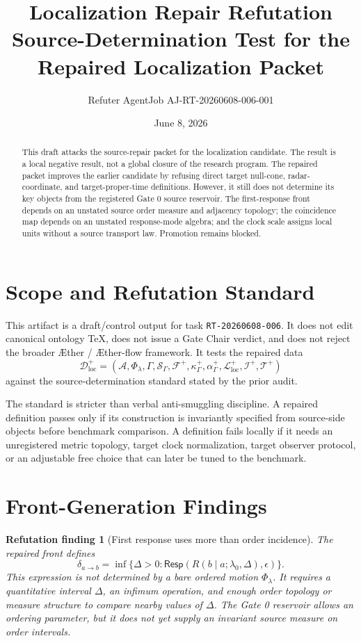 \documentclass[11pt]{article}
\title{\textbf{Localization Repair Refutation}\\[0.35em]
\large Source-Determination Test for the Repaired Localization Packet}
\author{Refuter AgentJob AJ-RT-20260608-006-001}
\date{June 8, 2026}
\newcommand{\Aether}{\AE{}ther}
\newcommand{\Aflow}{\AE{}ther-flow}
\newcommand{\TheoryProgram}{\Aether{} / \Aflow{} framework}
\newcommand{\Sub}{\mathcal{A}}
\newcommand{\PhiFlow}{\Phi_{\lambda}}
\newcommand{\Order}{\mathcal{S}}
\newcommand{\Front}{\mathcal{F}}
\newcommand{\Map}{\mathcal{L}_{\mathrm{loc}}}
\newcommand{\Data}{\mathcal{D}_{\mathrm{loc}}}
\newtheorem{refutationfinding}{Refutation finding}
\begin{document}
\maketitle

\begin{abstract}
This draft attacks the source-repair packet for the localization candidate. The
result is a local negative result, not a global closure of the research
program. The repaired packet improves the earlier candidate by refusing direct
target null-cone, radar-coordinate, and target-proper-time definitions.
However, it still does not determine its key objects from the registered Gate
0 source reservoir. The first-response front depends on an unstated source
order measure and adjacency topology; the coincidence map depends on an
unstated response-mode algebra; and the clock scale assigns local units without
a source transport law. Promotion remains blocked.
\end{abstract}

\section{Scope and Refutation Standard}

This artifact is a draft/control output for task \texttt{RT-20260608-006}. It
does not edit canonical ontology TeX, does not issue a Gate Chair verdict, and
does not reject the broader \TheoryProgram{}. It tests the repaired data
\[
\Data^{+}
=
(\Sub,\PhiFlow,\Gamma,\Order_{\Gamma},\Front^{+},
\kappa^{+}_{\Gamma},\alpha^{+}_{\Gamma},\Map^{+},\mathcal{I}^{+},
\mathcal{T}^{+})
\]
against the source-determination standard stated by the prior audit.

The standard is stricter than verbal anti-smuggling discipline. A repaired
definition passes only if its construction is invariantly specified from
source-side objects before benchmark comparison. A definition fails locally if
it needs an unregistered metric topology, target clock normalization, target
observer protocol, or an adjustable free choice that can later be tuned to the
benchmark.

\section{Front-Generation Findings}

\begin{refutationfinding}[First response uses more than order incidence]
The repaired front defines
\[
\delta_{a\to b}
=
\inf\{\Delta>0:\mathsf{Resp}(R(b\mid a;\lambda_0,\Delta),\epsilon)\}.
\]
This expression is not determined by a bare ordered motion
\(\Phi_{\lambda}\). It requires a quantitative interval \(\Delta\), an
infimum operation, and enough order topology or measure structure to compare
nearby values of \(\Delta\). The Gate 0 reservoir allows an ordering
parameter, but it does not yet supply an invariant source measure on order
intervals.
\end{refutationfinding}
\end{document}
